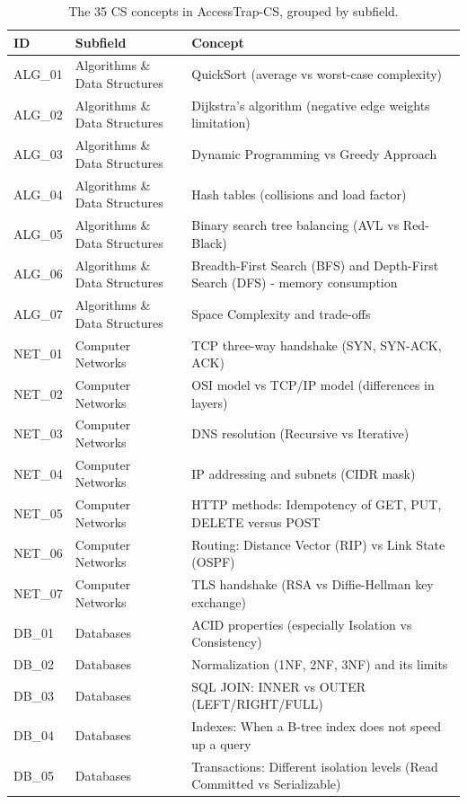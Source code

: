 \begin{table}[H]
\caption{The 35 CS concepts in AccessTrap-CS, grouped by subfield.}
\label{tab:concepts:all}
\centering
\begin{tabular}{lll}
\toprule
ID & Subfield & Concept \\
\midrule
ALG_01 & Algorithms \& Data Structures & QuickSort (average vs worst-case complexity) \\
ALG_02 & Algorithms \& Data Structures & Dijkstra's algorithm (negative edge weights limitation) \\
ALG_03 & Algorithms \& Data Structures & Dynamic Programming vs Greedy Approach \\
ALG_04 & Algorithms \& Data Structures & Hash tables (collisions and load factor) \\
ALG_05 & Algorithms \& Data Structures & Binary search tree balancing (AVL vs Red-Black) \\
ALG_06 & Algorithms \& Data Structures & Breadth-First Search (BFS) and Depth-First Search (DFS) - memory consumption \\
ALG_07 & Algorithms \& Data Structures & Space Complexity and trade-offs \\
NET_01 & Computer Networks & TCP three-way handshake (SYN, SYN-ACK, ACK) \\
NET_02 & Computer Networks & OSI model vs TCP/IP model (differences in layers) \\
NET_03 & Computer Networks & DNS resolution (Recursive vs Iterative) \\
NET_04 & Computer Networks & IP addressing and subnets (CIDR mask) \\
NET_05 & Computer Networks & HTTP methods: Idempotency of GET, PUT, DELETE versus POST \\
NET_06 & Computer Networks & Routing: Distance Vector (RIP) vs Link State (OSPF) \\
NET_07 & Computer Networks & TLS handshake (RSA vs Diffie-Hellman key exchange) \\
DB_01 & Databases & ACID properties (especially Isolation vs Consistency) \\
DB_02 & Databases & Normalization (1NF, 2NF, 3NF) and its limits \\
DB_03 & Databases & SQL JOIN: INNER vs OUTER (LEFT/RIGHT/FULL) \\
DB_04 & Databases & Indexes: When a B-tree index does not speed up a query \\
DB_05 & Databases & Transactions: Different isolation levels (Read Committed vs Serializable) \\

\end{tabular}
\end{table}
